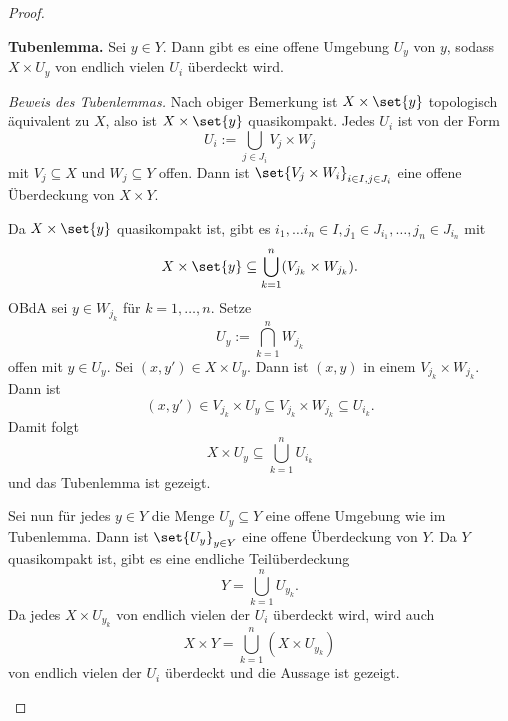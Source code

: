 \documentclass[language=ngerman]{TemplateLecture} %
\begin{document}
\begin{proof}
\begin{enumerate}[$(i)$:]
        \textbf{Tubenlemma.} Sei $y \in Y$. Dann gibt es eine offene Umgebung $U_y$ von $y$, sodass $X \times U_y$ von endlich vielen $U_i$ überdeckt wird.

        \emph{Beweis des Tubenlemmas.} Nach obiger Bemerkung ist $X \times \set{y}$ topologisch äquivalent zu $X$, also ist $X \times \set{y}$ quasikompakt. Jedes $U_i$ ist von der Form 
        \begin{equation*}
            U_i := \bigcup_{j \in J_i} V_j \times W_j
        \end{equation*}
        mit $V_j \subseteq X$ und $W_j \subseteq Y$ offen. Dann ist $\set{V_j \times W_i}_{i \in I, j \in J_i}$ eine offene Überdeckung von $X \times Y$.

        Da $X \times \set{y}$ quasikompakt ist, gibt es $i_1, \ldots i_n \in I, j_1 \in J_{i_1}, \ldots, j_n \in J_{i_n}$ mit
        \begin{align*}
            X \times \set{y} \subseteq \bigcup_{k = 1}^n (V_{j_k} \times W_{j_k}).
        \end{align*}
        OBdA sei $y \in W_{j_k}$ für $k = 1,\ldots,n$. Setze
        \begin{equation*}
            U_y := \bigcap_{k = 1}^n W_{j_k}
        \end{equation*}
        offen mit $y \in U_y$. Sei $(x,y') \in X \times U_y$. Dann ist $(x,y)$ in einem $V_{j_k} \times W_{j_k}$. Dann ist
        \begin{equation}
            (x,y') \in V_{j_k} \times U_y \subseteq V_{j_k} \times W_{j_k} \subseteq U_{i_k}.
        \end{equation}
        Damit folgt 
        \begin{equation*}
            X \times U_y \subseteq \bigcup_{k = 1}^n U_{i_k}
        \end{equation*}
        und das Tubenlemma ist gezeigt.

        Sei nun für jedes $y \in Y$ die Menge $U_y \subseteq Y$ eine offene Umgebung wie im Tubenlemma. Dann ist $\set{U_y}_{y \in Y}$ eine offene Überdeckung von $Y$. Da $Y$ quasikompakt ist, gibt es eine endliche Teilüberdeckung 
        \begin{equation*}
            Y = \bigcup_{k = 1}^n U_{y_k}. 
        \end{equation*}
        Da jedes $X \times U_{y_k}$ von endlich vielen der $U_i$ überdeckt wird, wird auch 
        \begin{equation*}
            X \times Y = \bigcup_{k = 1}^n (X \times U_{y_k})
        \end{equation*}
        von endlich vielen der $U_i$ überdeckt und die Aussage ist gezeigt.
    \end{enumerate}
\end{proof}
\end{document}
